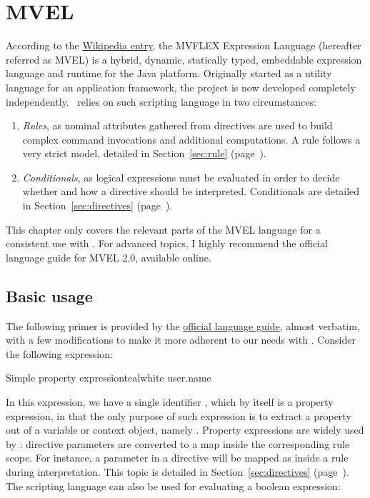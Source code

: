\chapter{MVEL}
\label{chap:mvel}

According to the \href{https://en.wikipedia.org/wiki/MVEL}{Wikipedia entry}, the MVFLEX Expression Language (hereafter referred as MVEL) is a hybrid, dynamic, statically typed, embeddable expression language and runtime for the Java platform. Originally started as a utility language for an application framework, the project is now developed completely independently. \arara\ relies on such scripting language in two circumstances:

\begin{enumerate}
\item\emph{Rules}, as nominal attributes gathered from directives are used to build complex command invocations and additional computations. A rule follows a very strict model, detailed in Section~\ref{sec:rule} (page~\pageref{sec:rule}).

\item\emph{Conditionals}, as logical expressions must be evaluated in order to decide whether and how a directive should be interpreted. Conditionals are detailed in Section~\ref{sec:directives} (page~\pageref{sec:directives}).
\end{enumerate}

This chapter only covers the relevant parts of the MVEL language for a consistent use with \arara. For advanced topics, I highly recommend the official language guide for MVEL 2.0, available online.

\section{Basic usage}
\label{sec:mvelbasicusage}

The following primer is provided by the \href{https://mvel.documentnode.com/}{official language guide}, almost verbatim, with a few modifications to make it more adherent to our needs with \arara. Consider the following expression:

\begin{codebox}{Simple property expression}{teal}{\icnote}{white}
user.name
\end{codebox}

In this expression, we have a single identifier , which by itself is a property expression, in that the only purpose of such expression is to extract a property out of a variable or context object, namely . Property expressions are widely used by \arara: directive parameters are converted to a map inside the corresponding rule scope. For instance, a parameter  in a directive will be mapped as  inside a rule during interpretation. This topic is detailed in Section~\ref{sec:directives} (page~\pageref{sec:directives}). The scripting language can also be used for evaluating a boolean expression:

